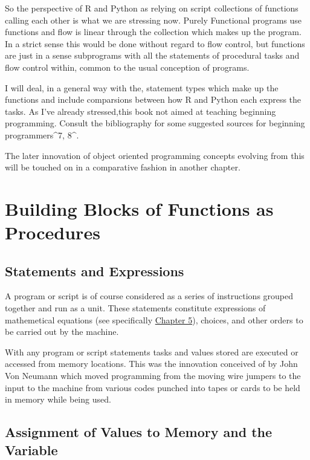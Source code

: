 \documentclass[]{book}
\theoremstyle{definition}
\theoremstyle{definition}
\theoremstyle{definition}
\theoremstyle{remark}
\begin{document}
So the perspective of R and Python as relying on script collections of
functions calling each other is what we are stressing now. Purely
Functional programs use functions and flow is linear through the
collection which makes up the program. In a strict sense this would be
done without regard to flow control, but functions are just in a sense
subprograms with all the statements of procedural tasks and flow control
within, common to the usual conception of programs.

I will deal, in a general way with the, statement types which make up
the functions and include comparsions between how R and Python each
express the tasks. As I've already stressed,this book not aimed at
teaching beginning programming. Consult the bibliography for some
suggested sources for beginning programmers\^{}7, 8\^{}.
 

The later innovation of object oriented programming concepts evolving
from this will be touched on in a comparative fashion in another
chapter.

\section{Building Blocks of Functions as
Procedures}\label{building-blocks-of-functions-as-procedures}

\subsection{\texorpdfstring{Statements and Expressions
}{Statements and Expressions  }}\label{statements-and-expressions}

A program or script is of course considered as a series of instructions
grouped together and run as a unit. These statements constitute
expressions of mathemetical equations (see specifically \href{}{Chapter
5}), choices, and other orders to be carried out by the machine.

With any program or script statements tasks and values stored are
executed or accessed from memory locations. This was the innovation
conceived of by John Von Neumann which moved programming from the moving
wire jumpers to the input to the machine from various codes punched into
tapes or cards to be held in memory while being used.

\subsection{\texorpdfstring{Assignment of Values to Memory and the
Variable
}{Assignment of Values to Memory and the Variable }}\label{assignment-of-values-to-memory-and-the-variable}
\end{document}
